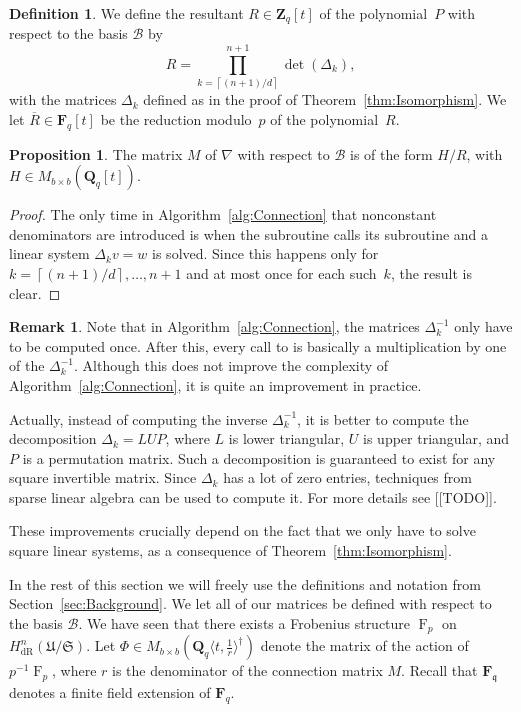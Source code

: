 \documentclass[a4paper,11pt]{article}
\numberwithin{equation}{section}
\providecommand{\ceil}[1]{\left\lceil#1\right\rceil}   %
\newcommand{\ZZ}{\mathbf{Z}} %
\newcommand{\QQ}{\mathbf{Q}} %
\newcommand{\FF}{\mathbf{F}} %
\DeclareMathOperator{\Frob}{F}           %
\providecommand{\HdR}{H_{\text{dR}}}    %
\providecommand{\cB}{\mathcal{B}} %
\theoremstyle{definition}
\newtheorem{prop}[thm]{Proposition}
\newtheorem{defn}[thm]{Definition}
\newtheorem{rem}[thm]{Remark}
\begin{document}
\begin{defn} \label{defn:resultant}
We define the resultant $R \in \ZZ_q[t]$ of the polynomial~$P$ with 
respect to the basis $\cB$ by
\[
R = \prod_{k=\ceil{(n+1)/d}}^{n+1}  \det(\Delta_k),
\]
with the matrices $\Delta_k$ defined as in the proof of 
Theorem~\ref{thm:Isomorphism}. We let $\overline{R} \in \FF_q[t]$ be the 
reduction modulo~$p$ of the polynomial~$R$.
\end{defn}

\begin{prop} \label{thm:denom}
The matrix $M$ of $\nabla$ with respect to $\cB$ is of the form
$H/R$, with $H \in M_{b \times b}(\QQ_q[t])$.
\end{prop}

\begin{proof}
The only time in Algorithm~\ref{alg:Connection} that nonconstant denominators 
are introduced is when the subroutine {} calls its subroutine 
{} and a linear system $\Delta_k v = w$ is solved. Since this 
happens only for $k=\ceil{(n+1)/d}, \dotsc, n+1$ and at most once for each 
such~$k$, the result is clear.
\end{proof}

\begin{rem} 
Note that in Algorithm~\ref{alg:Connection}, the matrices $\Delta_k^{-1}$ 
only have to be computed once. After this, every call to {} 
is basically a multiplication by one of the $\Delta_k^{-1}$.  Although this 
does not improve the complexity of Algorithm~\ref{alg:Connection}, it is 
quite an improvement in practice. 

Actually, instead of computing the inverse $\Delta_k^{-1}$, it is better 
to compute the decomposition $\Delta_k = L U P$, where $L$ is lower triangular, 
$U$ is upper triangular, and $P$ is a permutation matrix. Such a decomposition 
is guaranteed to exist for any square invertible matrix. Since $\Delta_k$ has 
a lot of zero entries, techniques from sparse linear algebra can be used to 
compute it. For more details see [[TODO]].


These improvements crucially depend on the fact that we only have to solve 
square linear systems, as a consequence of Theorem~\ref{thm:Isomorphism}.
\end{rem}

In the rest of this section we will freely use the definitions and notation 
from Section~\ref{sec:Background}. We let all of our matrices be defined with 
respect to the basis $\cB$. We have seen that there exists a Frobenius 
structure $\Frob_p$ on $\HdR^n(\mathfrak{U}/\mathfrak{S})$. Let 
$\Phi \in M_{b \times b}(\QQ_q \langle t, \frac{1}{r} \rangle^{\dag})$ 
denote the matrix of the action of $p^{-1}\Frob_p$, where $r$ is the 
denominator of the connection matrix $M$. Recall that $\FF_{\mathfrak{q}}$ 
denotes a finite field extension of $\FF_q$. 
\end{document}

